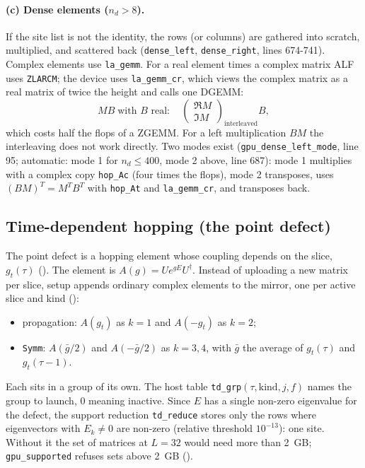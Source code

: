 \paragraph{(c) Dense elements ($n_d>8$).} If the site list is not the identity, the rows (or columns) are gathered into scratch, multiplied, and scattered back (\texttt{dense\_left}, \texttt{dense\_right}, lines 674-741). Complex elements use \texttt{la\_gemm}. For a real element times a complex matrix ALF uses \texttt{ZLARCM}; the device uses \texttt{la\_gemm\_cr}, which views the complex matrix as a real matrix of twice the height and calls one DGEMM:
\begin{equation}
M B \;\text{with $B$ real}:\quad \begin{pmatrix}\Re M\\ \Im M\end{pmatrix}_{\text{interleaved}} B ,
\end{equation}
which costs half the flops of a ZGEMM. For a left multiplication $BM$ the interleaving does not work directly. Two modes exist (\texttt{gpu\_dense\_left\_mode}, line 95; automatic: mode 1 for $n_d\le400$, mode 2 above, line 687): mode 1 multiplies with a complex copy \texttt{hop\_Ac} (four times the flops), mode 2 transposes, uses $(BM)^T=M^TB^T$ with \texttt{hop\_At} and \texttt{la\_gemm\_cr}, and transposes back.

\subsection{Time-dependent hopping (the point defect)}

The point defect is a hopping element whose coupling depends on the slice, $g_t(\tau)$ (). The element is $A(g)=U e^{gE}U^\dagger$. Instead of uploading a new matrix per slice, setup appends ordinary complex elements to the mirror, one per active slice and kind ():
\begin{itemize}
\item propagation: $A(g_t)$ as $k=1$ and $A(-g_t)$ as $k=2$;
\item \texttt{Symm}: $A(\bar g/2)$ and $A(-\bar g/2)$ as $k=3,4$, with $\bar g$ the average of $g_t(\tau)$ and $g_t(\tau-1)$.
\end{itemize}
Each sits in a group of its own. The host table \texttt{td\_grp}$(\tau,\text{kind},j,f)$ names the group to launch, 0 meaning inactive. Since $E$ has a single non-zero eigenvalue for the defect, the support reduction \texttt{td\_reduce} stores only the rows where eigenvectors with $E_k\ne0$ are non-zero (relative threshold $10^{-13}$): one site. Without it the set of matrices at $L=32$ would need more than 2~GB; \texttt{gpu\_supported} refuses sets above 2~GB ().

